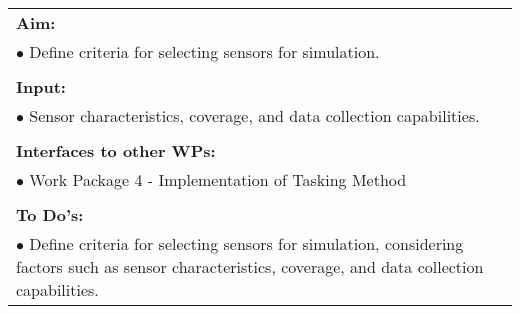 \begin{table}[!h]
\begin{center}
\begin{tabular}{|p{35mm}||p{55mm}|p{50mm}||p{40mm}|}
      \hline\hline
      \multicolumn{4}{|p{150mm}|}{\textbf{Aim:}}                                                                                                                                                            \\
      \multicolumn{4}{|p{150mm}|}{$\bullet$ Define criteria for selecting sensors for simulation.}                                                   \\
      \multicolumn{4}{|p{150mm}|}{}                                                                                                                                                                           \\
      \multicolumn{4}{|p{150mm}|}{\textbf{Input:}}                                                                                                                                                            \\
      \multicolumn{4}{|p{150mm}|}{$\bullet$ Sensor characteristics, coverage, and data collection capabilities.}                                                                                                                                 \\
      \multicolumn{4}{|p{150mm}|}{}                                                                                                                                                                           \\
      \multicolumn{4}{|p{150mm}|}{\textbf{Interfaces to other WPs:}}                                                                                                                                    \\
      \multicolumn{4}{|p{150mm}|}{$\bullet$ Work Package 4 - Implementation of Tasking Method}                                                                                              \\
      \multicolumn{4}{|p{150mm}|}{}                                                                                                                                                                           \\
      \multicolumn{4}{|p{150mm}|}{\textbf{To Do's:}}                                                                                                                                                         \\
      \multicolumn{4}{|p{150mm}|}{$\bullet$ Define criteria for selecting sensors for simulation, considering factors such as sensor characteristics, coverage, and data collection capabilities.}\\

\end{tabular}
\end{center}
\end{table}
